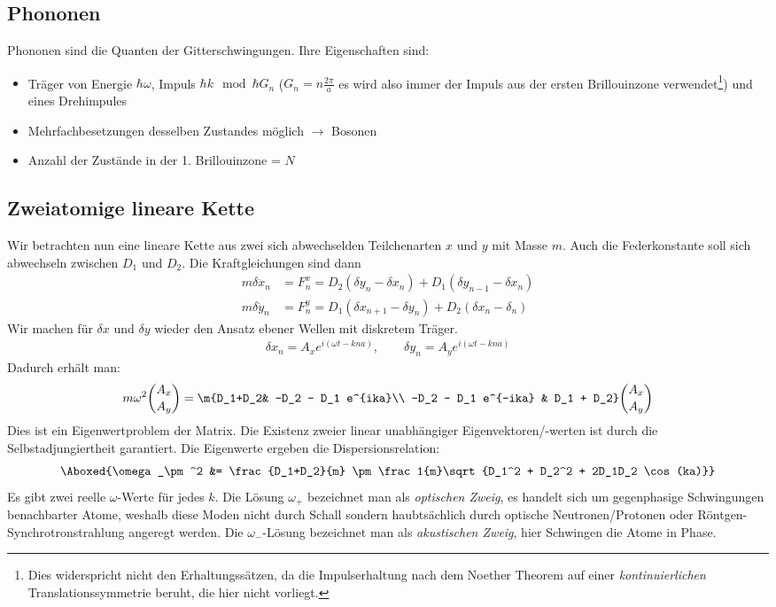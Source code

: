\documentclass[bfvec]{summery_5.0}
\begin{document}
\subsection{Phononen}
Phononen sind die Quanten der Gitterschwingungen. Ihre Eigenschaften sind:
\begin{itemize}
    \item Träger von Energie $\hbar\omega$, Impuls $\hbar k \mod \hbar G_n$ ($G_n = n\frac{2\pi}{a}$ es wird also immer der Impuls aus der ersten Brillouinzone verwendet\footnote{Dies widerspricht nicht den Erhaltungssätzen, da die Impulserhaltung nach dem Noether Theorem auf einer \emph{kontinuierlichen} Translationssymmetrie beruht, die hier nicht vorliegt.}) und eines Drehimpules
    \item Mehrfachbesetzungen desselben Zustandes möglich $\to$ Bosonen 
    \item Anzahl der Zustände in der 1. Brillouinzone = $N$
\end{itemize}



\subsection{Zweiatomige lineare Kette}
Wir betrachten nun eine lineare Kette aus zwei sich abwechselden Teilchenarten $x$ und $y$ mit Masse $m$. Auch die Federkonstante soll sich abwechseln zwischen $D_1$ und $D_2$. Die Kraftgleichungen sind dann
\begin{align*}
    m \delta \ddot x_n &= F_n^x = D_2 (\delta y_n - \delta x_n) + D_1(\delta y_{n-1} -\delta x_n)\\
    m \delta \ddot y_n &= F_n^y = D_1 (\delta x_{n+1} - \delta y_n) + D_2(\delta x_{n} -\delta _n)
\end{align*}
Wir machen für $\delta x$ und $\delta y$ wieder den Ansatz ebener Wellen mit diskretem Träger.
\begin{align*}
    \delta x_n= A_x e^{i(\omega t - kna)},\qquad
    \delta y_n= A_y e^{i(\omega t - kna)}
\end{align*}
Dadurch erhält man: 
\begin{align*}
    m\omega^2 \binom{A_x}{A_y} = \m{D_1+D_2& -D_2 - D_1 e^{ika}\\ -D_2 - D_1 e^{-ika} & D_1 + D_2} \binom{A_x }{A_y}
\end{align*}
Dies ist ein Eigenwertproblem der Matrix. Die Existenz zweier linear unabhängiger Eigenvektoren/-werten ist durch die Selbstadjungiertheit garantiert. Die Eigenwerte ergeben die Dispersionsrelation:
\begin{align*}
    \Aboxed{\omega_\pm^2 &= \frac{D_1+D_2}{m} \pm \frac1{m}\sqrt{D_1^2 + D_2^2 + 2D_1D_2 \cos(ka)}}
\end{align*} 
Es gibt zwei reelle $\omega$-Werte für jedes $k$. Die Lösung $\omega_+$ bezeichnet man als \emph{optischen Zweig}, es handelt sich um gegenphasige Schwingungen benachbarter Atome, weshalb diese Moden nicht durch Schall sondern haubtsächlich durch optische Neutronen/Protonen oder Röntgen-Synchrotronstrahlung angeregt werden. Die $\omega_-$-Lösung bezeichnet man als \emph{akustischen Zweig}, hier Schwingen die Atome in Phase. 
\end{document}
